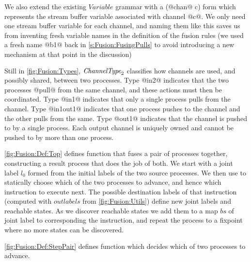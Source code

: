 

We also extend the existing $Variable$ grammar with a (@chan@ c) form which represents the stream buffer variable associated with channel @c@. We only need one stream buffer variable for each channel, and naming them like this saves us from inventing fresh variable names in the definition of the fusion rules (we used a fresh name @b1@ back in \autoref{s:Fusion:FusingPulls} to avoid introducing a new mechanism at that point in the discussion) 

Still in \autoref{fig:Fusion:Types}, $\textit{ChannelType}_2$ classifies how channels are used, and possibly shared, between two processes. Type @in2@ indicates that the two processes @pull@ from the same channel, and these actions must then be coordinated. Type @in1@ indicates that only a single process pulls from the channel. Type @in1out1@ indicates that one process pushes to the channel and the other pulls from the same. Type @out1@ indicates that the channel is pushed to by a single process. Each output channel is uniquely owned and cannot be pushed to by more than one process.





\smallskip
\autoref{fig:Fusion:Def:Top} defines function  that fuses a pair of processes together, constructing a result process that does the job of both. We start with a joint label $l_0$ formed from the initial labels of the two source processes. We then use  to statically choose which of the two processes to advance, and hence which instruction to execute next. The possible destination labels of that instruction (computed with $outlabels$ from \autoref{fig:Fusion:Utils}) define new joint labels and reachable states. As we discover reachable states we add them to a map $bs$ of joint label to corresponding the instruction, and repeat the process to a fixpoint where no more states can be discovered.



\autoref{fig:Fusion:Def:StepPair} defines function  which decides which of two processes to advance.

